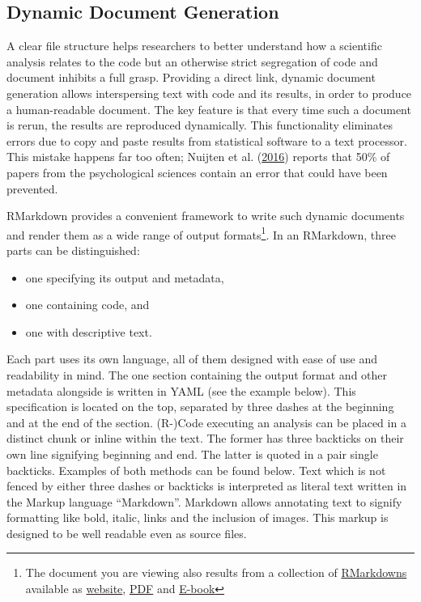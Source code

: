 \documentclass[12pt,a4paper,twoside]{article}
\providecommand{\tightlist}{%
  \setlength{\itemsep}{0pt}\setlength{\parskip}{0pt}}
\begin{document}
\hypertarget{dynamic-document-generation}{%
\subsection{Dynamic Document Generation}\label{dynamic-document-generation}}

A clear file structure helps researchers to better understand how a scientific analysis relates to the code but an otherwise strict segregation of code and document inhibits a full grasp.
Providing a direct link, dynamic document generation allows interspersing text with code and its results, in order to produce a human-readable document.
The key feature is that every time such a document is rerun, the results are reproduced dynamically.
This functionality eliminates errors due to copy and paste results from statistical software to a text processor. This mistake happens far too often; Nuijten et al. (\protect\hyperlink{ref-nuijtenPrevalenceStatisticalReporting2016}{2016}) reports that 50\% of papers from the psychological sciences contain an error that could have been prevented.

RMarkdown provides a convenient framework to write such dynamic documents and render them as a wide range of output formats\footnote{The document you are viewing also results from a collection of \href{https://github.com/aaronpeikert/repro-thesis}{RMarkdowns} available as \href{https://aaronpeikert.github.io/repro-thesis/}{website}, \href{https://aaronpeikert.github.io/repro-thesis/ma.pdf}{PDF} and \href{https://aaronpeikert.github.io/repro-thesis/ma.epub}{E-book}}. In an RMarkdown, three parts can be distinguished:

\begin{itemize}
\tightlist
\item
  one specifying its output and metadata,
\item
  one containing code, and
\item
  one with descriptive text.
\end{itemize}

Each part uses its own language, all of them designed with ease of use and readability in mind.
The one section containing the output format and other metadata alongside is written in YAML (see the example below).
This specification is located on the top, separated by three dashes at the beginning and at the end of the section.
(R-)Code executing an analysis can be placed in a distinct chunk or inline within the text.
The former has three backticks on their own line signifying beginning and end.
The latter is quoted in a pair single backticks.
Examples of both methods can be found below.
Text which is not fenced by either three dashes or backticks is interpreted as literal text written in the Markup language ``Markdown''.
Markdown allows annotating text to signify formatting like bold, italic, links and the inclusion of images.
This markup is designed to be well readable even as source files.
\end{document}

